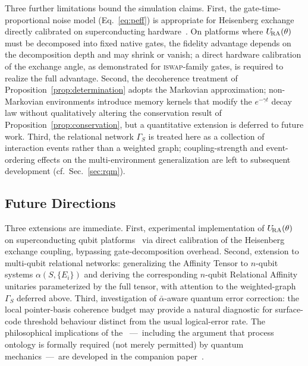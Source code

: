 Three further limitations bound the simulation claims.
First, the gate-time-proportional noise model (Eq.~\eqref{eq:peff})
is appropriate for Heisenberg exchange directly calibrated on
superconducting hardware~\cite{Krantz2019}.
On platforms where $U_{\!\mathrm{RA}}(\theta)$ must be decomposed into fixed native
gates, the fidelity advantage depends on the decomposition depth and
may shrink or vanish; a direct hardware calibration of the exchange
angle, as demonstrated for \textsc{iswap}-family gates, is required to
realize the full advantage.
Second, the decoherence treatment of Proposition~\ref{prop:determination}
adopts the Markovian approximation; non-Markovian environments introduce
memory kernels that modify the $e^{-\gamma t}$ decay law without
qualitatively altering the conservation result of
Proposition~\ref{prop:conservation}, but a quantitative extension is
deferred to future work.
Third, the relational network $\Gamma_S$ is treated here as a collection
of interaction events rather than a weighted graph; coupling-strength
and event-ordering effects on the multi-environment generalization are
left to subsequent development (cf.\ Sec.~\ref{sec:rqm}).

\subsection{Future Directions}

Three extensions are immediate.
First, experimental implementation of $U_{\!\mathrm{RA}}(\theta)$ on superconducting
qubit platforms~\cite{Krantz2019} via direct calibration of the
Heisenberg exchange coupling, bypassing gate-decomposition overhead.
Second, extension to multi-qubit relational networks: generalizing the
Affinity Tensor to $n$-qubit systems $\alpha(S,\{E_i\})$ and deriving
the corresponding $n$-qubit Relational Affinity unitaries parameterized
by the full tensor, with attention to the weighted-graph $\Gamma_S$
deferred above.
Third, investigation of $\bar\alpha$-aware quantum error correction:
the local pointer-basis coherence budget may provide a natural
diagnostic for surface-code threshold behaviour distinct from the usual
logical-error rate.
The philosophical implications of the \RCT~---~including the argument
that process ontology is formally required (not merely permitted) by
quantum mechanics~---~are developed in the companion
paper~\cite{Adams2026Philosophy}.
